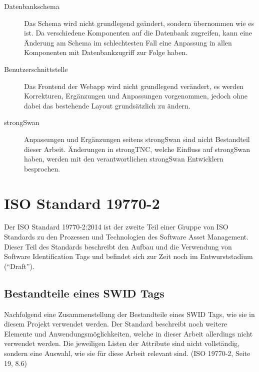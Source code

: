 \begin{description}
	\item[Datenbankschema] Das Schema wird nicht grundlegend geändert, sondern
	übernommen wie es ist. Da verschiedene Komponenten auf die Datenbank zugreifen,
	kann eine Änderung am Schema im schlechtesten Fall eine Anpassung in allen
	Komponenten mit Datenbankzugriff zur Folge haben.

	\item[Benutzerschnittstelle] Das Frontend der Webapp wird nicht grundlegend
	verändert, es werden Korrekturen, Ergänzungen und Anpassungen vorgenommen,
	jedoch ohne dabei das bestehende Layout grundsätzlich zu ändern.

	\item[strongSwan] Anpassungen und Ergänzungen seitens strongSwan sind nicht
	Bestandteil dieser Arbeit. Änderungen in strongTNC, welche Einfluss auf
	strongSwan haben, werden mit den verantwortlichen strongSwan Entwicklern
	besprochen.
\end{description}

\section{ISO Standard 19770-2} 
Der ISO Standard 19770-2:2014 ist der zweite Teil einer Gruppe von ISO Standards
zu den Prozessen und Technologien des Software Asset Management. Dieser Teil des
Standards beschreibt den Aufbau und die Verwendung von Software Identification
Tags und befindet sich zur Zeit noch im Entwurststadium (\enquote{Draft}).

\subsection{Bestandteile eines SWID Tags}
Nachfolgend eine Zusammenstellung der Bestandteile eines SWID Tags, wie sie in
diesem Projekt verwendet werden. Der Standard beschreibt noch weitere Elemente
und Anwendungsmöglichkeiten, welche in dieser Arbeit allerdings nicht verwendet
werden. Die jeweiligen Listen der Attribute sind nicht vollständig, sondern eine
Auswahl, wie sie für diese Arbeit relevant sind. (ISO
19770-2\cite{iso19770-2}, Seite 19, 8.6)

